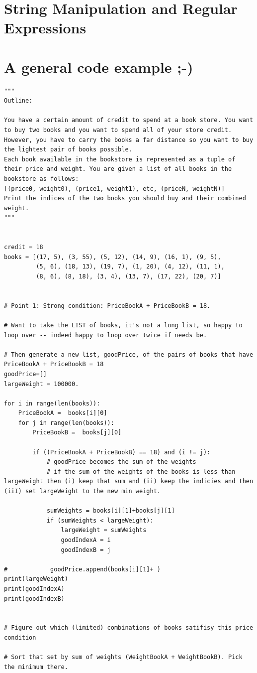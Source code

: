 \documentclass[11pt,a4paper]{article}
\begin{document}
    
\newpage
\section{String Manipulation and Regular Expressions}






\newpage
\section{A general code example ;-)} 

\begin{lstlisting}
"""
Outline:

You have a certain amount of credit to spend at a book store. You want to buy two books and you want to spend all of your store credit. However, you have to carry the books a far distance so you want to buy the lightest pair of books possible.
Each book available in the bookstore is represented as a tuple of their price and weight. You are given a list of all books in the bookstore as follows:
[(price0, weight0), (price1, weight1), etc, (priceN, weightN)]
Print the indices of the two books you should buy and their combined weight.
"""
    
    
credit = 18
books = [(17, 5), (3, 55), (5, 12), (14, 9), (16, 1), (9, 5),
         (5, 6), (18, 13), (19, 7), (1, 20), (4, 12), (11, 1),
         (8, 6), (8, 18), (3, 4), (13, 7), (17, 22), (20, 7)]


# Point 1: Strong condition: PriceBookA + PriceBookB = 18. 

# Want to take the LIST of books, it's not a long list, so happy to loop over -- indeed happy to loop over twice if needs be. 

# Then generate a new list, goodPrice, of the pairs of books that have PriceBookA + PriceBookB = 18
goodPrice=[]
largeWeight = 100000.

for i in range(len(books)):
    PriceBookA =  books[i][0] 
    for j in range(len(books)):
        PriceBookB =  books[j][0] 
        
        if ((PriceBookA + PriceBookB) == 18) and (i != j):
            # goodPrice becomes the sum of the weights 
            # if the sum of the weights of the books is less than largeWeight then (i) keep that sum and (ii) keep the indicies and then (iiI) set largeWeight to the new min weight. 
            
            sumWeights = books[i][1]+books[j][1]
            if (sumWeights < largeWeight):
                largeWeight = sumWeights
                goodIndexA = i     
                goodIndexB = j            
        
#            goodPrice.append(books[i][1]+ )
print(largeWeight) 
print(goodIndexA)
print(goodIndexB)


# Figure out which (limited) combinations of books satifisy this price condition

# Sort that set by sum of weights (WeightBookA + WeightBookB). Pick the minimum there. 

\end{lstlisting}
\end{document}
